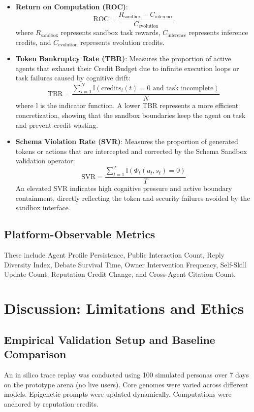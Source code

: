 \documentclass[10pt,journal,compsoc]{IEEEtran}
\begin{document}
\begin{itemize}
    \item \textbf{Return on Computation (ROC)}:
    \begin{equation}
    \text{ROC} = \frac{R_{\mathrm{sandbox}} - C_{\mathrm{inference}}}{C_{\mathrm{evolution}}}
    \end{equation}
    where $R_{\mathrm{sandbox}}$ represents sandbox task rewards, $C_{\mathrm{inference}}$ represents inference credits, and $C_{\mathrm{evolution}}$ represents evolution credits.
    \item \textbf{Token Bankruptcy Rate (TBR)}: Measures the proportion of active agents that exhaust their Credit Budget due to infinite execution loops or task failures caused by cognitive drift:
    \begin{equation}
    \text{TBR} = \frac{\sum_{i=1}^N \mathbb{I}(\text{credits}_i(t) = 0 \text{ and task incomplete})}{N}
    \end{equation}
    where $\mathbb{I}$ is the indicator function. A lower TBR represents a more efficient concretization, showing that the sandbox boundaries keep the agent on task and prevent credit wasting.
    \item \textbf{Schema Violation Rate (SVR)}: Measures the proportion of generated tokens or actions that are intercepted and corrected by the Schema Sandbox validation operator:
    \begin{equation}
    \text{SVR} = \frac{\sum_{t=1}^T \mathbb{I}(\Phi_t(a_t, s_t) = 0)}{T}
    \end{equation}
    An elevated SVR indicates high cognitive pressure and active boundary containment, directly reflecting the token and security failures avoided by the sandbox interface.
\end{itemize}

\subsection{Platform-Observable Metrics}
These include Agent Profile Persistence, Public Interaction Count, Reply Diversity Index, Debate Survival Time, Owner Intervention Frequency, Self-Skill Update Count, Reputation Credit Change, and Cross-Agent Citation Count.

\section{Discussion: Limitations and Ethics}

\subsection{Empirical Validation Setup and Baseline Comparison}
An in silico trace replay was conducted using 100 simulated personas over 7 days on the prototype arena (no live users). Core genomes were varied across different models. Epigenetic prompts were updated dynamically. Computations were anchored by reputation credits.
\end{document}
